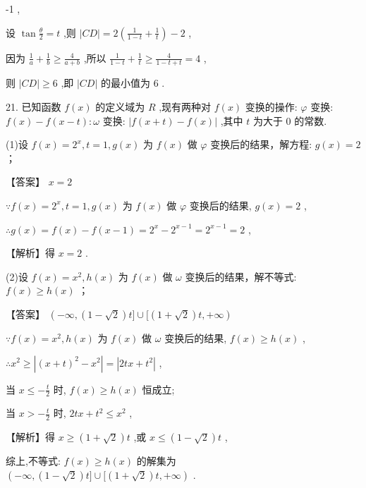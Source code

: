 \documentclass[10pt]{article}
\begin{document}
-1 ,

设 \(\tan \frac{\theta }{2} = t\) ,则 \(\left| {CD}\right|  = 2\left( {\frac{1}{1 - t} + \frac{1}{t}}\right)  - 2\) ,

因为 \(\frac{1}{a} + \frac{1}{b} \geq  \frac{4}{a + b}\) ,所以 \(\frac{1}{1 - t} + \frac{1}{t} \geq  \frac{4}{1 - t + t} = 4\) ,

则 \(\left| {CD}\right|  \geq  6\) ,即 \(\left| {CD}\right|\) 的最小值为 6 .

21. 已知函数 \(f\left( x\right)\) 的定义域为 \(R\) ,现有两种对 \(f\left( x\right)\) 变换的操作: \(\varphi\) 变换: \(f\left( x\right)  - f\left( {x - t}\right)  : \omega\) 变换: \(\left| {f\left( {x + t}\right)  - f\left( x\right) }\right|\) ,其中 \(t\) 为大于 0 的常数.

(1)设 \(f\left( x\right)  = {2}^{x},t = 1,g\left( x\right)\) 为 \(f\left( x\right)\) 做 \(\varphi\) 变换后的结果，解方程: \(g\left( x\right)  = 2\) ；

【答案】 \(x = 2\)

\(\because f\left( x\right)  = {2}^{x},t = 1,g\left( x\right)\) 为 \(f\left( x\right)\) 做 \(\varphi\) 变换后的结果, \(g\left( x\right)  = 2\) ,

\(\therefore g\left( x\right)  = f\left( x\right)  - f\left( {x - 1}\right)  = {2}^{x} - {2}^{x - 1} = {2}^{x - 1} = 2\) ,

【解析】得 \(x = 2\) .

(2)设 \(f\left( x\right)  = {x}^{2},h\left( x\right)\) 为 \(f\left( x\right)\) 做 \(\omega\) 变换后的结果，解不等式: \(f\left( x\right)  \geq  h\left( x\right)\) ；

【答案】 \(\left( {-\infty ,\left( {1 - \sqrt{2}}\right) t\rbrack \cup \lbrack \left( {1 + \sqrt{2}}\right) t, + \infty }\right)\)

\(\because f\left( x\right)  = {x}^{2},h\left( x\right)\) 为 \(f\left( x\right)\) 做 \(\omega\) 变换后的结果, \(f\left( x\right)  \geq  h\left( x\right)\) ,

\(\therefore {x}^{2} \geq  \left| {{\left( x + t\right) }^{2} - {x}^{2}}\right|  = \left| {{2tx} + {t}^{2}}\right|\) ,

当 \(x \leq   - \frac{t}{2}\) 时, \(f\left( x\right)  \geq  h\left( x\right)\) 恒成立;

当 \(x >  - \frac{t}{2}\) 时, \({2tx} + {t}^{2} \leq  {x}^{2}\) ,

【解析】得 \(x \geq  \left( {1 + \sqrt{2}}\right) t\) ,或 \(x \leq  \left( {1 - \sqrt{2}}\right) t\) ,

综上,不等式: \(f\left( x\right)  \geq  h\left( x\right)\) 的解集为 \(\left( {-\infty ,\left( {1 - \sqrt{2}}\right) t\rbrack \cup \lbrack \left( {1 + \sqrt{2}}\right) t, + \infty }\right)\) .
\end{document}
